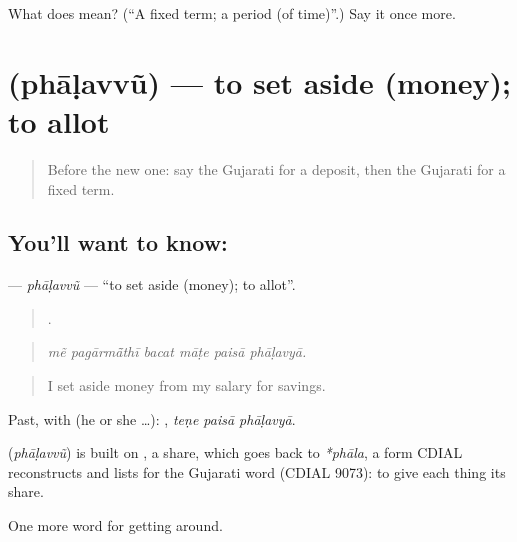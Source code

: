 \begin{tcolorbox}[breakable,colback=teal!4,colframe=teal!35!black,title={Before you move on}]
What does  mean? (\textquotedblleft{}A fixed term; a period (of time)\textquotedblright{}.) Say it once more.
\end{tcolorbox}
\section[\texorpdfstring{\gu{ફાળવવું} (phāḷavvũ)}{ફાળવવું (phāḷavvũ)}]{ (phāḷavvũ) — to set aside (money); to allot}

\label{lesson:GU-C427-phalavvu}



\begin{quote}
Before the new one: say the Gujarati for a deposit, then the Gujarati for a fixed term.
\end{quote}

\subsection*{You'll want to know: }
\textbf{} — \emph{phāḷavvũ} — \textquotedblleft{}to set aside (money); to allot\textquotedblright{}.

\begin{quote}
     .
\end{quote}

\begin{quote}
\emph{mẽ pagārmā̃thī bacat māṭe paisā phāḷavyā.}
\end{quote}

\begin{quote}
I set aside money from my salary for savings.
\end{quote}

Past, with  (he or she …):   , \emph{teṇe paisā phāḷavyā}.

\begin{cousinweb}
\textbf{} (\emph{phāḷavvũ}) is built on , a share, which goes back to \emph{*phāla}, a form CDIAL reconstructs and lists for the Gujarati word (CDIAL 9073): to give each thing its share.
\end{cousinweb}

\begin{grammarlens}[title={What you've built}]
One more word for getting around.
\end{grammarlens}

